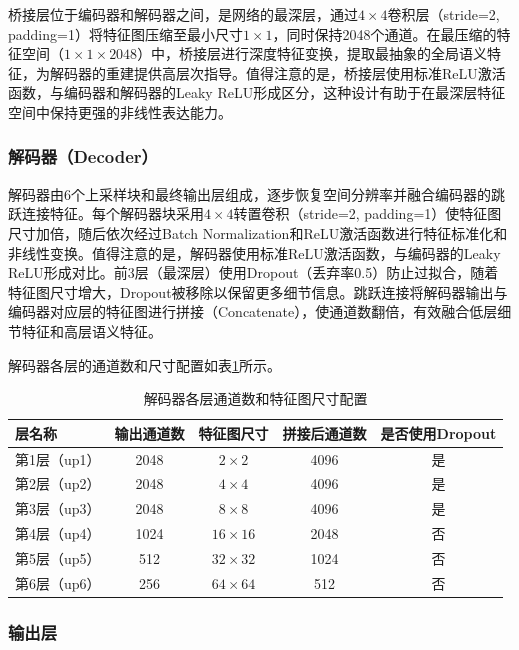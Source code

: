 {桥接层位于编码器和解码器之间，是网络的最深层，通过$4\times4$卷积层（stride=2, padding=1）将特征图压缩至最小尺寸$1\times1$，同时保持2048个通道。在最压缩的特征空间（$1\times1\times2048$）中，桥接层进行深度特征变换，提取最抽象的全局语义特征，为解码器的重建提供高层次指导。值得注意的是，桥接层使用标准ReLU激活函数，与编码器和解码器的Leaky ReLU形成区分，这种设计有助于在最深层特征空间中保持更强的非线性表达能力。

\subsubsection{解码器（Decoder）}

解码器由6个上采样块和最终输出层组成，逐步恢复空间分辨率并融合编码器的跳跃连接特征。每个解码器块采用$4\times4$转置卷积（stride=2, padding=1）使特征图尺寸加倍，随后依次经过Batch Normalization和ReLU激活函数进行特征标准化和非线性变换。值得注意的是，解码器使用标准ReLU激活函数，与编码器的Leaky ReLU形成对比。前3层（最深层）使用Dropout（丢弃率0.5）防止过拟合，随着特征图尺寸增大，Dropout被移除以保留更多细节信息。跳跃连接将解码器输出与编码器对应层的特征图进行拼接（Concatenate），使通道数翻倍，有效融合低层细节特征和高层语义特征。

解码器各层的通道数和尺寸配置如表\ref{tab:decoder_config}所示。

\begin{table}[htbp]
    \centering
    \small
    \caption{解码器各层通道数和特征图尺寸配置}
    \label{tab:decoder_config}
    \begin{tabular}{lcccc}
        \hline
        \textbf{层名称} & \textbf{输出通道数} & \textbf{特征图尺寸} & \textbf{拼接后通道数} & \textbf{是否使用Dropout} \\
        \hline
        第1层（up1） & 2048 & $2\times2$ & 4096 & 是 \\
        第2层（up2） & 2048 & $4\times4$ & 4096 & 是 \\
        第3层（up3） & 2048 & $8\times8$ & 4096 & 是 \\
        第4层（up4） & 1024 & $16\times16$ & 2048 & 否 \\
        第5层（up5） & 512 & $32\times32$ & 1024 & 否 \\
        第6层（up6） & 256 & $64\times64$ & 512 & 否 \\
        \hline
    \end{tabular}
\end{table}


\subsubsection{输出层}

}
